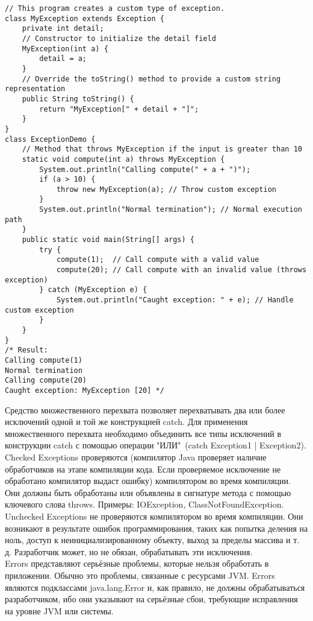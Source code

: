 \begin{lstlisting}
// This program creates a custom type of exception.
class MyException extends Exception {
    private int detail;
    // Constructor to initialize the detail field
    MyException(int a) {
        detail = a;
    }
    // Override the toString() method to provide a custom string representation
    public String toString() {
        return "MyException[" + detail + "]";
    }
}
class ExceptionDemo {
    // Method that throws MyException if the input is greater than 10
    static void compute(int a) throws MyException {
        System.out.println("Calling compute(" + a + ")");
        if (a > 10) {
            throw new MyException(a); // Throw custom exception
        }
        System.out.println("Normal termination"); // Normal execution path
    }
    public static void main(String[] args) {
        try {
            compute(1);  // Call compute with a valid value
            compute(20); // Call compute with an invalid value (throws exception)
        } catch (MyException e) {
            System.out.println("Caught exception: " + e); // Handle custom exception
        }
    }
}
/* Result:
Calling compute(1)
Normal termination
Calling compute(20)
Caught exception: MyException [20] */
\end{lstlisting}
Средство множественного перехвата позволяет перехватывать два или более исключений одной и той же конструкцией catch. 
Для применения множественного перехвата необходимо объединить все типы исключений в конструкции catch с помощью операции "ИЛИ"\, (catch Exception1 | Exception2). \\
Checked Exceptions  проверяются (компилятор Java проверяет наличие обработчиков на этапе компиляции кода. Если проверяемое исключение не обработано компилятор выдаст ошибку) компилятором во время компиляции. Они должны быть обработаны или объявлены в сигнатуре метода с помощью ключевого слова throws. Примеры: IOException, ClassNotFoundException. \\
Unchecked Exceptions не проверяются компилятором во время компиляции. Они возникают в результате ошибок программирования, таких как попытка деления на ноль, доступ к неинициализированному объекту, выход за пределы массива и т. д. Разработчик может, но не обязан, обрабатывать эти исключения. \\
Errors представляют серьёзные проблемы, которые нельзя обработать в приложении. Обычно это проблемы, связанные с ресурсами JVM. Errors являются подклассами java.lang.Error и, как правило, не должны обрабатываться разработчиком, ибо они указывают на серьёзные сбои, требующие исправления на уровне JVM или системы.
